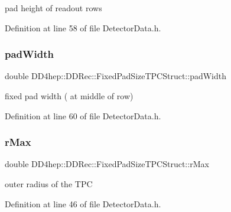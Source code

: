 pad height of readout rows 



Definition at line 58 of file Detector\+Data.\+h.

\hypertarget{struct_d_d4hep_1_1_d_d_rec_1_1_fixed_pad_size_t_p_c_struct_aeac7b4785ec2067ddf6d50b8e19c8ee0}{}\label{struct_d_d4hep_1_1_d_d_rec_1_1_fixed_pad_size_t_p_c_struct_aeac7b4785ec2067ddf6d50b8e19c8ee0} 
\subsubsection{\texorpdfstring{pad\+Width}{padWidth}}
{\footnotesize\ttfamily double D\+D4hep\+::\+D\+D\+Rec\+::\+Fixed\+Pad\+Size\+T\+P\+C\+Struct\+::pad\+Width}



fixed pad width ( at middle of row) 



Definition at line 60 of file Detector\+Data.\+h.

\hypertarget{struct_d_d4hep_1_1_d_d_rec_1_1_fixed_pad_size_t_p_c_struct_a623ee3ca76535b9c0ec2fe6c3e1ce415}{}\label{struct_d_d4hep_1_1_d_d_rec_1_1_fixed_pad_size_t_p_c_struct_a623ee3ca76535b9c0ec2fe6c3e1ce415} 
\subsubsection{\texorpdfstring{r\+Max}{rMax}}
{\footnotesize\ttfamily double D\+D4hep\+::\+D\+D\+Rec\+::\+Fixed\+Pad\+Size\+T\+P\+C\+Struct\+::r\+Max}



outer radius of the T\+PC 



Definition at line 46 of file Detector\+Data.\+h.

\hypertarget{struct_d_d4hep_1_1_d_d_rec_1_1_fixed_pad_size_t_p_c_struct_adf51c80b073c09ae26ce58fec05324ae}{}\label{struct_d_d4hep_1_1_d_d_rec_1_1_fixed_pad_size_t_p_c_struct_adf51c80b073c09ae26ce58fec05324ae} 
